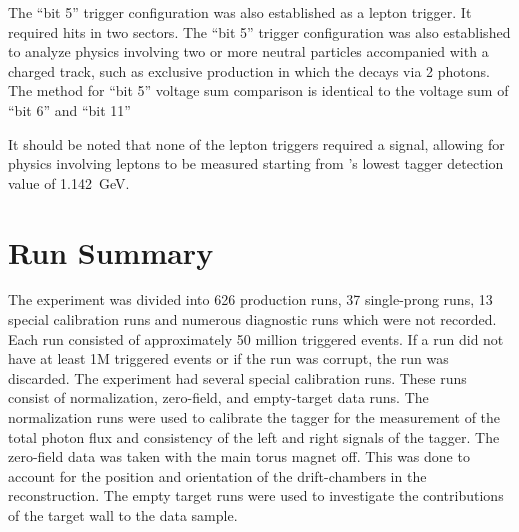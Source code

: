 		The ``bit 5'' trigger configuration was also established as a lepton trigger. It required  hits in two sectors. The ``bit 5'' trigger configuration was also established to analyze physics involving two or more neutral particles accompanied with a charged track, such as exclusive \piz production in which the \piz decays via 2 photons. The method for ``bit 5'' voltage sum comparison is identical to the  voltage sum of ``bit 6'' and ``bit 11''
		
		It should be noted that none of the lepton triggers required a  signal, allowing for physics involving leptons to be measured starting from 's lowest tagger detection value of 1.142~GeV.
		
%		
%		
%		
%		
		
		
		\section{ Run Summary}\label{sec:clas.g12.runs}
		
		The  experiment was divided into 626 production runs, 37 single-prong runs, 13 special calibration runs and numerous diagnostic runs which were not recorded. Each run consisted of approximately 50 million triggered events. If a run did not have at least 1M triggered events or if the run was corrupt, the run was discarded.
		The  experiment had several special calibration runs. These runs consist of normalization, zero-field, and empty-target data runs. The normalization runs were used to calibrate the tagger for the measurement of the total photon flux and consistency of the left and right  signals of the tagger. The zero-field data was taken with the main torus magnet off. This was done to account for the position and orientation of the drift-chambers in the reconstruction. The empty target runs were used to investigate the contributions of the target wall to the data sample.

